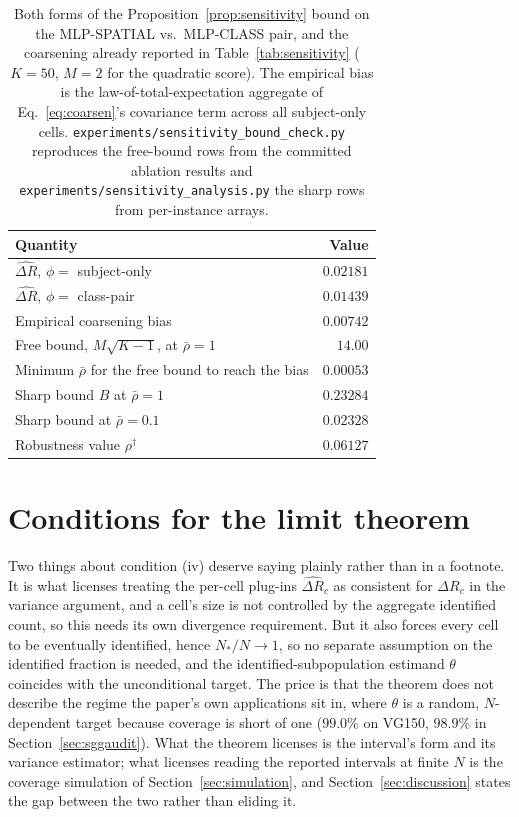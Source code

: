 \begin{table}[t]
\centering
\caption{Both forms of the Proposition~\ref{prop:sensitivity} bound on the
MLP-SPATIAL vs.\ MLP-CLASS pair, and the coarsening already reported in
Table~\ref{tab:sensitivity} ($K=50$, $M=2$ for the quadratic score). The empirical bias
is the law-of-total-expectation aggregate of Eq.~\eqref{eq:coarsen}'s covariance
term across all subject-only cells.
\texttt{experiments/sensitivity\_bound\_check.py} reproduces the free-bound rows from the
committed ablation results and \texttt{experiments/sensitivity\_analysis.py} the sharp
rows from per-instance arrays.}
\label{tab:sensitivity-numeric}
\begin{tabular}{lr}
\toprule
Quantity & Value \\
\midrule
$\widehat{\Delta R}$, $\phi=$ subject-only & $0.02181$ \\
$\widehat{\Delta R}$, $\phi=$ class-pair & $0.01439$ \\
Empirical coarsening bias & $0.00742$ \\
\midrule
Free bound, $M\sqrt{K-1}$, at $\bar\rho=1$ & $14.00$ \\
Minimum $\bar\rho$ for the free bound to reach the bias & $0.00053$ \\
\midrule
Sharp bound $B$ at $\bar\rho=1$ & $0.23284$ \\
Sharp bound at $\bar\rho=0.1$ & $0.02328$ \\
Robustness value $\rho^\dagger$ & $0.06127$ \\
\bottomrule
\end{tabular}
\end{table}

\section{Conditions for the limit theorem}\label{app:clt}

Two things about condition (iv) deserve saying plainly rather than in a footnote. It is
what licenses treating the per-cell plug-ins $\widehat{\Delta R}_c$ as consistent for
$\Delta R_c$ in the variance argument, and a cell's size is not controlled by the
aggregate identified count, so this needs its own divergence requirement. But it also
forces every cell to be eventually identified, hence $N_*/N\to1$, so no separate
assumption on the identified fraction is needed, and the identified-subpopulation estimand
$\theta$ coincides with the unconditional target. The price is that the theorem does not describe the
regime the paper's own applications sit in, where $\theta$ is a random, $N$-dependent
target because coverage is short of one ($99.0\%$ on VG150, $98.9\%$ in
Section~\ref{sec:sggaudit}). What the theorem licenses is the interval's form and its
variance estimator; what licenses reading the reported intervals at finite $N$ is the
coverage simulation of Section~\ref{sec:simulation}, and Section~\ref{sec:discussion}
states the gap between the two rather than eliding it.

